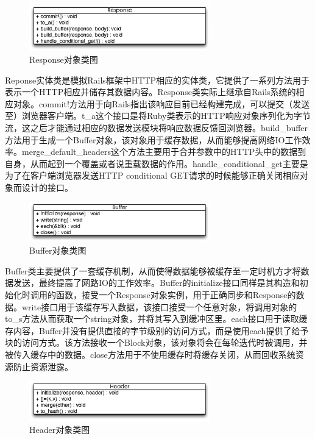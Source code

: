 \begin{figure}[h]
\centering
\includegraphics[width=0.7\textwidth]{images/detail/response_class.eps}
\caption{Response对象类图}
\label{fig-response-class}
\end{figure}

Reponse实体类是模拟Rails框架中HTTP相应的实体类，它提供了一系列方法用于表示一个HTTP相应并储存其数据内容。Response类实际上继承自Rails系统的相应对象。commit!方法用于向Rails指出该响应目前已经构建完成，可以提交（发送至）浏览器客户端。t\_a这个接口是将Ruby类表示的HTTP响应对象序列化为字节流，这之后才能通过相应的数据发送模块将响应数据反馈回浏览器。build\_buffer方法用于生成一个Buffer对象，该对象用于缓存数据，从而能够提高网络IO工作效率。merge\_default\_headers这个方法主要用于合并参数中的HTTP头中的数据到自身，从而起到一个覆盖或者说重载数据的作用。handle\_conditional\_get主要是为了在客户端浏览器发送HTTP conditional GET请求的时候能够正确关闭相应对象而设计的接口。

\begin{figure}[h]
\centering
\includegraphics[width=0.7\textwidth]{images/detail/buffer_class.eps}
\caption{Buffer对象类图}
\label{fig-buffer-class}
\end{figure}

Buffer类主要提供了一套缓存机制，从而使得数据能够被缓存至一定时机方才将数据发送，最终提高了网路IO的工作效率。Buffer的initialize接口同样是其构造和初始化时调用的函数，接受一个Response对象实例，用于正确同步和Response的数据。write接口用于该缓存写入数据，该接口接受一个任意对象，将调用对象的to\_s方法从而获取一个string对象，并将其写入到缓冲区里。each接口用于读取缓存内容，Buffer并没有提供直接的字节级别的访问方式，而是使用each提供了给予块的访问方式。该方法接收一个Block对象，该对象将会在每轮迭代时被调用，并被传入缓存中的数据。close方法用于不使用缓存时将缓存关闭，从而回收系统资源防止资源泄露。

\begin{figure}[h]
\centering
\includegraphics[width=0.7\textwidth]{images/detail/header_class.eps}
\caption{Header对象类图}
\label{fig-header-class}
\end{figure}

